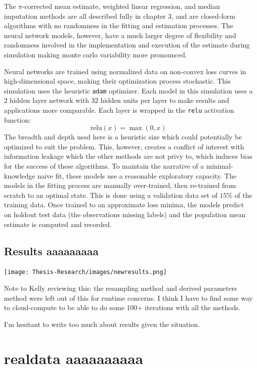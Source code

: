 \documentclass[12pt,twoside]{reedthesis}
\begin{document}
The \(\pi\)-corrected mean estimate, weighted linear regression, and
median imputation methods are all described fully in chapter 3, and are
closed-form algorithms with no randomness in the fitting and estimation
processes. The neural network models, however, have a much larger degree
of flexibility and randomness involved in the implementation and
execution of the estimate during simulation making monte carlo
variability more pronounced.

Neural networks are trained using normalized data on non-convex loss
curves in high-dimensional space, making their optimization process
stochastic. This simulation uses the heuristic \texttt{adam} optimizer.
Each model in this simulation uses a 2 hidden layer network with 32
hidden units per layer to make results and applications more comparable.
Each layer is wrapped in the \texttt{relu} activation function: \[
\text{relu}(x) = \max(0,x)
\] The breadth and depth used here is a heuristic size which could
potentially be optimized to suit the problem. This, however, creates a
conflict of interest with information leakage which the other methods
are not privy to, which induces bias for the success of these
algorithms. To maintain the narrative of a minimal-knowledge naive fit,
these models use a reasonable exploratory capacity. The models in the
fitting process are manually over-trained, then re-trained from scratch
to an optimal state. This is done using a validation data set of
\(15\%\) of the training data. Once trained to an approximate loss
minima, the models predict on holdout test data (the observations
missing labels) and the population mean estimate is computed and
recorded.

\section{Results aaaaaaaaa}\label{results-aaaaaaaaa}

\texttt{[image: Thesis-Research/images/newresults.png]}

Note to Kelly reviewing this: the resampling method and derived
parameters method were left out of this for runtime concerns. I think I
have to find some way to cloud-compute to be able to do some 100+
iterations with all the methods.

I'm hesitant to write too much about results given the situation.

\chapter{realdata aaaaaaaaaa}\label{realdata-aaaaaaaaaa}
\end{document}

